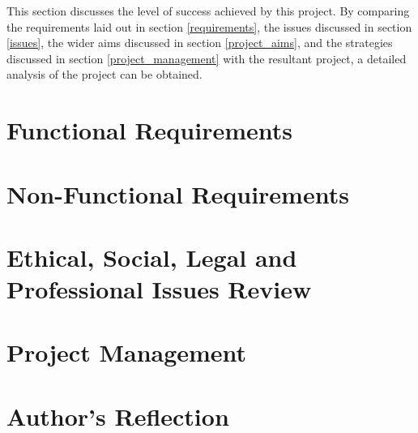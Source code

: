 This section discusses the level of success achieved by this project. By comparing the requirements laid out in section \ref{requirements}, the issues discussed in section \ref{issues}, the wider aims discussed in section \ref{project_aims}, and the strategies discussed in section \ref{project_management} with the resultant project, a detailed analysis of the project can be obtained.

\section{Functional Requirements}
\label{evaluation_functional_requirements}


\section{Non-Functional Requirements}
\label{evaluation_non_functional_requirements}


\section{Ethical, Social, Legal and Professional Issues Review}
\label{ethical_social_legal_and_professional_issues_review}


\section{Project Management}
\label{evaluation_project_management}


\section{Author's Reflection}
\label{authors_reflection}


